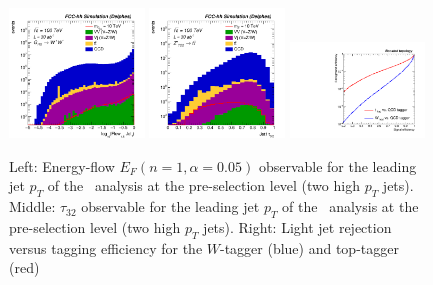\begin{figure}[!htbp]\centering
\includegraphics[width=0.32\textwidth]{Fig/TMVA/Jet1_Flow15_sel0_nostack_logx-eps-converted-to.pdf}
\includegraphics[width=0.32\textwidth]{Fig/TMVA/Jet1_tau32_sel0_nostack_log-eps-converted-to.pdf}
\includegraphics[width=0.32\textwidth]{Fig/TMVA/effQCD_vs_effWhadBlue_thadRed_log.pdf}
\caption{Left: Energy-flow $E_{F}(n=1,\alpha=0.05)$ observable for the leading jet $p_T$ of the \rsg\ analysis at the pre-selection level (two high $p_T$ jets). Middle: $\tau_{32}$ observable for the leading jet $p_T$ of the \Zptt\ analysis at the pre-selection level (two high $p_T$ jets). Right: Light jet rejection versus tagging efficiency for the $W$-tagger (blue) and top-tagger (red)}
\label{fig:TMVA_final_result}
\end{figure}


